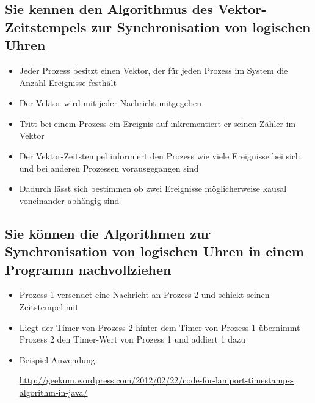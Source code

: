 
\subsection{Sie kennen den Algorithmus des Vektor-Zeitstempels zur Synchronisation von logischen Uhren}

\begin{itemize}
	\item Jeder Prozess besitzt einen Vektor, der für jeden Prozess im System die Anzahl Ereignisse festhält
	\item Der Vektor wird mit jeder Nachricht mitgegeben
	\item Tritt bei einem Prozess ein Ereignis auf inkrementiert er seinen Zähler im Vektor
	\item Der Vektor-Zeitstempel informiert den Prozess wie viele Ereignisse bei sich und bei anderen Prozessen vorausgegangen sind
	\item Dadurch lässt sich bestimmen ob zwei Ereignisse möglicherweise kausal voneinander abhängig sind
\end{itemize}


\subsection{Sie können die Algorithmen zur Synchronisation von logischen Uhren in einem Programm nachvollziehen}

\begin{itemize}
	\item Prozess 1 versendet eine Nachricht an Prozess 2 und schickt seinen Zeitstempel mit
	\item Liegt der Timer von Prozess 2 hinter dem Timer von Prozess 1 übernimmt Prozess 2 den Timer-Wert von Prozess 1 und addiert 1 dazu
	\item Beispiel-Anwendung:
	
	\href{http://geekum.wordpress.com/2012/02/22/code-for-lamport-timestamps-algorithm-in-java/}{http://geekum.wordpress.com/2012/02/22/code-for-lamport-timestamps-algorithm-in-java/}
\end{itemize}

